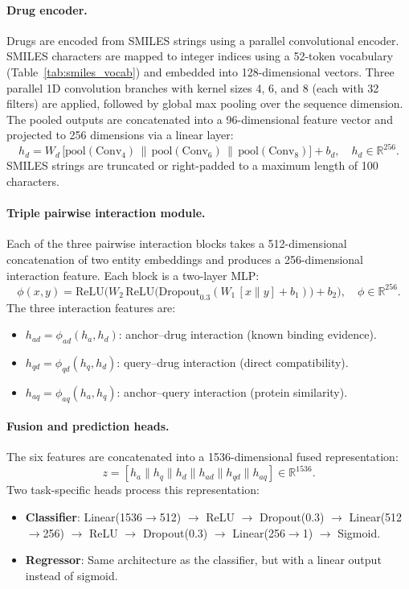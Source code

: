 \documentclass[11pt]{article}
\begin{document}
\paragraph{Drug encoder.}
Drugs are encoded from SMILES strings using a parallel convolutional encoder. SMILES characters are mapped to integer indices using a 52-token vocabulary (Table~\ref{tab:smiles_vocab}) and embedded into 128-dimensional vectors. Three parallel 1D convolution branches with kernel sizes 4, 6, and 8 (each with 32 filters) are applied, followed by global max pooling over the sequence dimension. The pooled outputs are concatenated into a 96-dimensional feature vector and projected to 256 dimensions via a linear layer:
\[
h_d = W_d\,\big[\mathrm{pool}(\mathrm{Conv}_4) \,\|\, \mathrm{pool}(\mathrm{Conv}_6) \,\|\, \mathrm{pool}(\mathrm{Conv}_8)\big] + b_d, \quad h_d \in \mathbb{R}^{256}.
\]
SMILES strings are truncated or right-padded to a maximum length of 100 characters.

\paragraph{Triple pairwise interaction module.}
Each of the three pairwise interaction blocks takes a 512-dimensional concatenation of two entity embeddings and produces a 256-dimensional interaction feature. Each block is a two-layer MLP:
\[
\phi(x, y) = \mathrm{ReLU}\!\Big(W_2\,\mathrm{ReLU}\!\big(\mathrm{Dropout}_{0.3}(W_1\,[x \| y] + b_1)\big) + b_2\Big), \quad \phi \in \mathbb{R}^{256}.
\]
The three interaction features are:
\begin{itemize}
    \item $h_{ad} = \phi_{ad}(h_a, h_d)$: anchor--drug interaction (known binding evidence).
    \item $h_{qd} = \phi_{qd}(h_q, h_d)$: query--drug interaction (direct compatibility).
    \item $h_{aq} = \phi_{aq}(h_a, h_q)$: anchor--query interaction (protein similarity).
\end{itemize}

\paragraph{Fusion and prediction heads.}
The six features are concatenated into a 1536-dimensional fused representation:
\[
z = [h_a \| h_q \| h_d \| h_{ad} \| h_{qd} \| h_{aq}] \in \mathbb{R}^{1536}.
\]
Two task-specific heads process this representation:
\begin{itemize}
    \item \textbf{Classifier}: Linear(1536$\to$512) $\to$ ReLU $\to$ Dropout(0.3) $\to$ Linear(512$\to$256) $\to$ ReLU $\to$ Dropout(0.3) $\to$ Linear(256$\to$1) $\to$ Sigmoid.
    \item \textbf{Regressor}: Same architecture as the classifier, but with a linear output instead of sigmoid.
\end{itemize}
\end{document}
